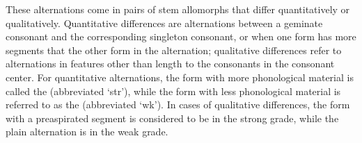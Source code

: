 These alternations come in pairs of stem allomorphs that differ quantitatively or qualitatively. %
Quantitative differences are alternations between a geminate consonant %
and the corresponding singleton consonant, or when one form has more segments that the other form in the alternation; qualitative differences refer to alternations in features other than length to the consonants in the consonant center. 
For quantitative alternations, the form with more phonological material is called the  (abbreviated ‘str’), while the form with less phonological material is referred to as the  (abbreviated ‘wk’). In cases of qualitative differences, the form with a preaspirated segment is considered to be in the strong grade, while the plain alternation is in the weak grade. 

